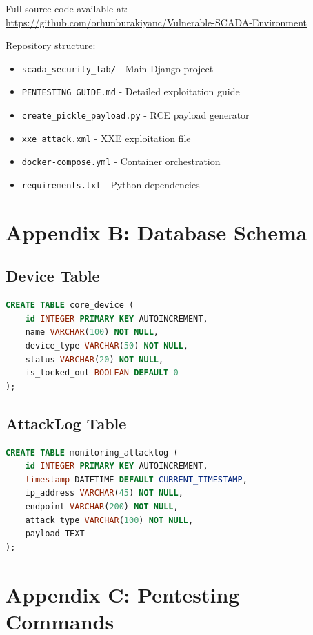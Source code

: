 \documentclass[12pt,a4paper]{article}
\begin{document}
Full source code available at:\\
\url{https://github.com/orhunburakiyanc/Vulnerable-SCADA-Environment}

Repository structure:
\begin{itemize}[leftmargin=*]
    \item \texttt{scada\_security\_lab/} - Main Django project
    \item \texttt{PENTESTING\_GUIDE.md} - Detailed exploitation guide
    \item \texttt{create\_pickle\_payload.py} - RCE payload generator
    \item \texttt{xxe\_attack.xml} - XXE exploitation file
    \item \texttt{docker-compose.yml} - Container orchestration
    \item \texttt{requirements.txt} - Python dependencies
\end{itemize}

\section{Appendix B: Database Schema}

\subsection{Device Table}
\begin{lstlisting}[language=SQL]
CREATE TABLE core_device (
    id INTEGER PRIMARY KEY AUTOINCREMENT,
    name VARCHAR(100) NOT NULL,
    device_type VARCHAR(50) NOT NULL,
    status VARCHAR(20) NOT NULL,
    is_locked_out BOOLEAN DEFAULT 0
);
\end{lstlisting}

\subsection{AttackLog Table}
\begin{lstlisting}[language=SQL]
CREATE TABLE monitoring_attacklog (
    id INTEGER PRIMARY KEY AUTOINCREMENT,
    timestamp DATETIME DEFAULT CURRENT_TIMESTAMP,
    ip_address VARCHAR(45) NOT NULL,
    endpoint VARCHAR(200) NOT NULL,
    attack_type VARCHAR(100) NOT NULL,
    payload TEXT
);
\end{lstlisting}

\section{Appendix C: Pentesting Commands}
\end{document}
